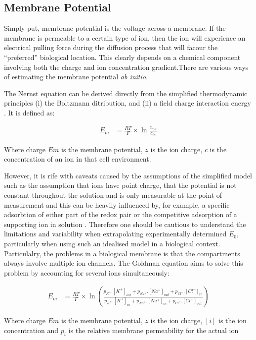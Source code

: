 \subsection{Membrane Potential}
Simply put, membrane potential is the voltage across a membrane. If the membrane is permeable to a certain type of ion, then the ion will experience an electrical pulling force during the diffusion process that will facour the ``preferred'' biological location. This clearly depends on a chemical component involving both the charge and ion concentration gradient.There are various ways of estimating the membrane potential {\it ab initio}.

The Nernst equation can be derived directly from the simplified thermodynamic principles (i) the Boltzmann ditribution, and (ii) a field charge interaction energy \cite{Feiner1994}. It is defined as:

\begin{align*}
{E}_{m} &= \frac{RT}{F}\times \ln { \frac{{c}_{out}}{{c}_{in}} }
\end{align*}

Where charge $Em$ is the membrane potential, $z$ is the ion charge, $c$ is the concentration of an ion in that cell environment.

However, it is rife with caveats caused by the assumptions of the simplified model such as the assumption that ions have point charge, that the potential is not constant throughout the solution and is only measurable at the point of measurement and this can be heavily influenced by, for example, a specific adsorbtion of either part of the redox pair or the competitive adsorption of a supporting ion in solution \cite{Feiner1994}. Therefore one should be cautious to understand the limitations and variability when extrapolating experimentally determined ${E}_{0}$, particularly when using such an idealised model in a biological context. Particulalry, the problems in a biological membrane is that the compartments always  involve multiple ion channels. The Goldman equation aims to solve this problem by accounting for several ions simultaneously:

\begin{align*}
{E}_{m} &= \frac{RT}{F}\times \ln \left(\frac{p_{K^+}.[K^+]_{out} + p_{Na^+}.[Na^+]_{out} + p_{Cl^-}.[Cl^-]_{in}} {p_{K^+}.[K^+]_{in} + p_{Na^+}.[Na^+]_{in} + p_{Cl^-}.[Cl^-]_{out}}\right)
\end{align*}

Where charge $Em$ is the membrane potential, $z$ is the ion charge, $[i]$ is the ion concentration and $p_i$ is the relative membrane permeability for the actual ion

